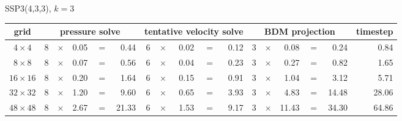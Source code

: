 \begin{center}
    SSP3(4,3,3), $k=3$\\[1ex]
    \begin{tabular}{|c|rcrcr|rcrcr|rcrcr|r|}
        \hline
        grid                                           &
        \multicolumn{5}{|c|}{pressure solve}           &
        \multicolumn{5}{|c|}{tentative velocity solve} &
        \multicolumn{5}{|c|}{BDM projection}           &
        timestep                                                                                                                                                           \\
        \hline\hline
        $ 4\times 4$                                   & 8 & $\times$ & 0.05 & $=$ & 0.44  & 6 & $\times$ & 0.02 & $=$ & 0.12 & 3 & $\times$ & 0.08  & $=$ & 0.24  & 0.84  \\
        $ 8\times 8$                                   & 8 & $\times$ & 0.07 & $=$ & 0.56  & 6 & $\times$ & 0.04 & $=$ & 0.23 & 3 & $\times$ & 0.27  & $=$ & 0.82  & 1.65  \\
        $16\times16$                                   & 8 & $\times$ & 0.20 & $=$ & 1.64  & 6 & $\times$ & 0.15 & $=$ & 0.91 & 3 & $\times$ & 1.04  & $=$ & 3.12  & 5.71  \\
        $32\times32$                                   & 8 & $\times$ & 1.20 & $=$ & 9.60  & 6 & $\times$ & 0.65 & $=$ & 3.93 & 3 & $\times$ & 4.83  & $=$ & 14.48 & 28.06 \\
        $48\times48$                                   & 8 & $\times$ & 2.67 & $=$ & 21.33 & 6 & $\times$ & 1.53 & $=$ & 9.17 & 3 & $\times$ & 11.43 & $=$ & 34.30 & 64.86 \\
        \hline\end{tabular}
\end{center}